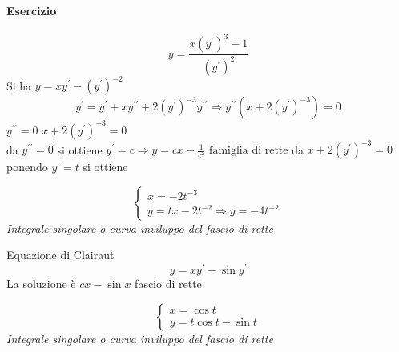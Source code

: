 \paragraph{Esercizio}
\begin{equation*}
	y=\frac{x(y^\prime)^3-1}{(y^\prime)^2}
\end{equation*}
Si ha $y=xy^\prime-(y^\prime)^{-2}$ 
\begin{equation*}
	y^\prime=y^\prime+xy^{\prime\prime}+2(y^\prime)^{-3}y^{\prime\prime}\Rightarrow y^{\prime\prime}(x+2(y^\prime)^{-3})=0
\end{equation*}
$y^{\prime\prime}=0$ $x+2(y^\prime)^{-3}=0$\\
da $y^{\prime\prime}=0$ si ottiene $y^\prime=c\Rightarrow y=cx-\frac{1}{c^2} \text{ famiglia di rette}$
da $x+2(y^\prime)^{-3}=0$ ponendo $y^\prime=t$ si ottiene
\begin{multicols}{2}
	\begin{equation*}
		\begin{cases}
			x=-2t^{-3}\\
			y=tx-2t^{-2}\Rightarrow y=-4t^{-2}
		\end{cases}
	\end{equation*}
	\textit{Integrale singolare o curva inviluppo del fascio di rette}
\end{multicols}
Equazione di Clairaut
\begin{equation*}
	y=xy^\prime-\sin y^\prime
\end{equation*}
La soluzione è $cx-\sin x$ fascio di rette
\begin{multicols}{2}
	\begin{equation*}
		\begin{cases}
			x=\cos t\\
			y=t\cos t-\sin t
		\end{cases}
	\end{equation*}
	\textit{Integrale singolare o curva inviluppo del fascio di rette}
\end{multicols}

